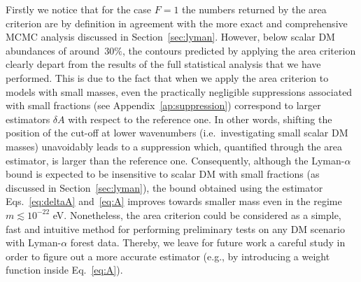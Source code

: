 \documentclass[11pt,nofootinbib]{article}
\numberwithin{equation}{section}
\begin{document}
 Firstly we notice that for the case $F=1$ the numbers returned by the area criterion are by definition in agreement with the more exact and comprehensive MCMC analysis discussed in Section~\ref{sec:lyman}.
 However, below scalar DM abundances of around~$30\%$, the
contours predicted by applying the area criterion clearly depart from
the results of the full statistical analysis that we have
performed. This is due to the fact that when we apply the area criterion
to models with small masses, even the practically negligible
suppressions associated with small fractions (see
Appendix~\ref{ap:suppression}) correspond to larger estimators $\delta
A$ with respect to the reference one. In other words, shifting the
position of the cut-off at lower wavenumbers (i.e.~investigating small
scalar DM masses) unavoidably leads to a suppression which, quantified
through the area estimator, is larger than the reference one.
Consequently, although the Lyman-$\alpha$ bound
is expected to be insensitive to scalar DM with small fractions
(as discussed in Section~\ref{sec:lyman}),
the bound obtained using the estimator Eqs.~\eqref{eq:deltaA}
and~\eqref{eq:A} improves towards smaller mass
even in the regime $m \lesssim 10^{-22}$ eV.
Nonetheless, the area criterion could be considered as a
simple, fast and intuitive method for performing preliminary tests on
any DM scenario with Lyman-$\alpha$ forest data. Thereby, we leave for
future work a careful study in order to figure out a more accurate
estimator (e.g., by introducing a weight function inside
Eq.~\eqref{eq:A}). 
\end{document}
